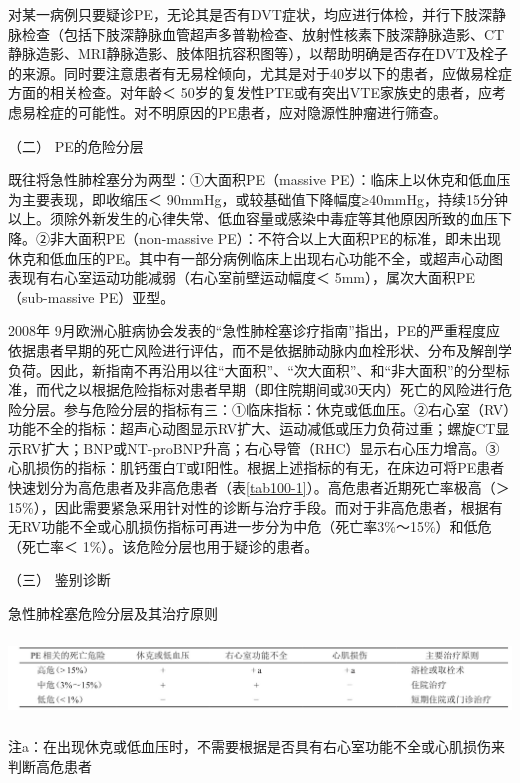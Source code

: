 对某一病例只要疑诊PE，无论其是否有DVT症状，均应进行体检，并行下肢深静脉检查（包括下肢深静脉血管超声多普勒检查、放射性核素下肢深静脉造影、CT静脉造影、MRI静脉造影、肢体阻抗容积图等），以帮助明确是否存在DVT及栓子的来源。同时要注意患者有无易栓倾向，尤其是对于40岁以下的患者，应做易栓症方面的相关检查。对年龄＜
50岁的复发性PTE或有突出VTE家族史的患者，应考虑易栓症的可能性。对不明原因的PE患者，应对隐源性肿瘤进行筛查。

\hypertarget{text00278.htmlux5cux23CHP9-8-2-3-2}{}
（二） PE的危险分层

既往将急性肺栓塞分为两型：①大面积PE（massive
PE）：临床上以休克和低血压为主要表现，即收缩压＜
90mmHg，或较基础值下降幅度≥40mmHg，持续15分钟以上。须除外新发生的心律失常、低血容量或感染中毒症等其他原因所致的血压下降。②非大面积PE（non-massive
PE）：不符合以上大面积PE的标准，即未出现休克和低血压的PE。其中有一部分病例临床上出现右心功能不全，或超声心动图表现有右心室运动功能减弱（右心室前壁运动幅度＜
5mm），属次大面积PE（sub-massive PE）亚型。

2008年
9月欧洲心脏病协会发表的“急性肺栓塞诊疗指南”指出，PE的严重程度应依据患者早期的死亡风险进行评估，而不是依据肺动脉内血栓形状、分布及解剖学负荷。因此，新指南不再沿用以往“大面积”、“次大面积”、和“非大面积”的分型标准，而代之以根据危险指标对患者早期（即住院期间或30天内）死亡的风险进行危险分层。参与危险分层的指标有三：①临床指标：休克或低血压。②右心室（RV）功能不全的指标：超声心动图显示RV扩大、运动减低或压力负荷过重；螺旋CT显示RV扩大；BNP或NT-proBNP升高；右心导管（RHC）显示右心压力增高。③心肌损伤的指标：肌钙蛋白T或I阳性。根据上述指标的有无，在床边可将PE患者快速划分为高危患者及非高危患者（表\ref{tab100-1}）。高危患者近期死亡率极高（＞
15\%），因此需要紧急采用针对性的诊断与治疗手段。而对于非高危患者，根据有无RV功能不全或心肌损伤指标可再进一步分为中危（死亡率3\%～15\%）和低危（死亡率＜
1\%）。该危险分层也用于疑诊的患者。

\hypertarget{text00278.htmlux5cux23CHP9-8-2-3-3}{}
（三） 鉴别诊断

\begin{table}[htbp]
\centering
\caption{急性肺栓塞危险分层及其治疗原则}
\label{tab100-1}
\includegraphics[width=6.65625in,height=0.84375in]{./images/Image00401.jpg}
\end{table}

注a：在出现休克或低血压时，不需要根据是否具有右心室功能不全或心肌损伤来判断高危患者

